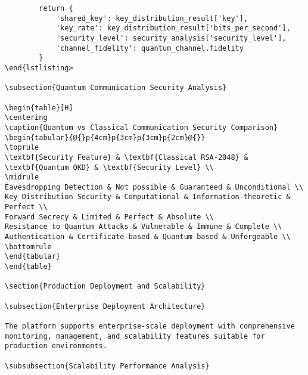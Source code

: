\documentclass[12pt,a4paper]{report}
\begin{document}
\begin{lstlisting}
        return {
            'shared_key': key_distribution_result['key'],
            'key_rate': key_distribution_result['bits_per_second'],
            'security_level': security_analysis['security_level'],
            'channel_fidelity': quantum_channel.fidelity
        }
\end{lstlisting>

\subsection{Quantum Communication Security Analysis}

\begin{table}[H]
\centering
\caption{Quantum vs Classical Communication Security Comparison}
\begin{tabular}{@{}p{4cm}p{3cm}p{3cm}p{2cm}@{}}
\toprule
\textbf{Security Feature} & \textbf{Classical RSA-2048} & \textbf{Quantum QKD} & \textbf{Security Level} \\
\midrule
Eavesdropping Detection & Not possible & Guaranteed & Unconditional \\
Key Distribution Security & Computational & Information-theoretic & Perfect \\
Forward Secrecy & Limited & Perfect & Absolute \\
Resistance to Quantum Attacks & Vulnerable & Immune & Complete \\
Authentication & Certificate-based & Quantum-based & Unforgeable \\
\bottomrule
\end{tabular}
\end{table}

\section{Production Deployment and Scalability}

\subsection{Enterprise Deployment Architecture}

The platform supports enterprise-scale deployment with comprehensive monitoring, management, and scalability features suitable for production environments.

\subsubsection{Scalability Performance Analysis}


\end{lstlisting}
\end{document}
